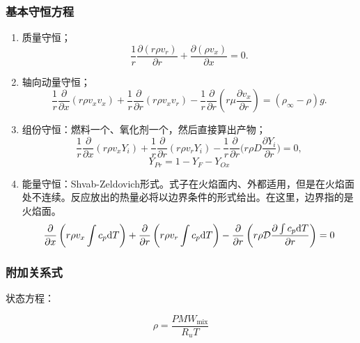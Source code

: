 \subsubsection{基本守恒方程}
\begin{enumerate}
    \item 质量守恒；
    \begin{equation}
        \frac{1}{r}\frac{\partial(r\rho v_{r})}{\partial r}+\frac{\partial(\rho v_{x})}{\partial x}=0.
    \end{equation}
    \item 轴向动量守恒；
    \begin{equation}
        \frac{1}{r}\frac{\partial}{\partial x}(r\rho v_{x}v_{x})+\frac{1}{r}\frac{\partial}{\partial r}(r\rho v_{x}v_{r})-\frac{1}{r}\frac{\partial}{\partial r}\!\left(r\mu\frac{\partial v_{x}}{\partial r}\right)=(\rho_{\infty}-\rho)g.
    \end{equation}
    \item 组份守恒：燃料一个、氧化剂一个，然后直接算出产物；
    \begin{equation}
        \frac{1}{r}\frac{\partial}{\partial x}(r\rho v_{x}Y_{i})+\frac{1}{r}\frac{\partial}{\partial r}(r\rho v_{r}Y_{i})-\frac{1}{r}\frac{\partial}{\partial r}\biggl(r\rho D\frac{\partial Y_{i}}{\partial r}\biggr)=0,
    \end{equation}
    \begin{equation}
        Y_{Pr} = 1 - Y_F - Y_{Ox}
    \end{equation}
    \item 能量守恒：Shvab-Zeldovich形式。式子在火焰面内、外都适用，但是在火焰面处不连续。反应放出的热量必将以边界条件的形式给出。在这里，边界指的是火焰面。
{\tiny
        \begin{equation}
        \frac{\partial}{\partial x}\left(r\rho v_x \int c_p \mathrm{d} T\right) + \frac{\partial}{\partial r}\left(r \rho v_r \int c_p \mathrm{d} T\right) - \frac{\partial}{\partial r}\left(r\rho \mathcal{D} \frac{\partial \int c_p \mathrm{d} T}{\partial r}\right) = 0
    \end{equation}}
\end{enumerate}

\subsubsection{附加关系式}
状态方程：

\begin{equation}
    \rho = \frac{P MW_\mathrm{mix}}{R_u T}
\end{equation}

